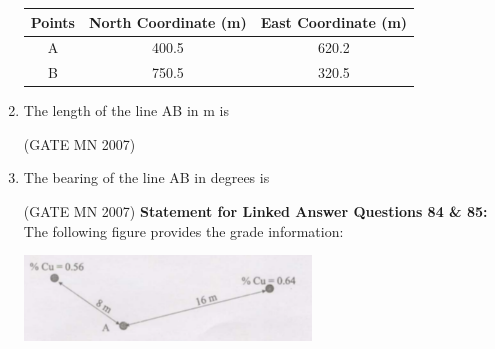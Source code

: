 \documentclass[journal]{IEEEtran}
\begin{document}
\begin{enumerate}
\begin{tabular}{|c|c|c|}
\hline
Points & North Coordinate (m) & East Coordinate (m) \\
\hline
A & 400.5 & 620.2 \\
\hline
B & 750.5 & 320.5 \\
\hline
\end{tabular}

\item The length of the line AB in m is  
\begin{enumerate}
\end{enumerate}
\hfill (GATE MN 2007)

\item The bearing of the line AB in degrees is  
\begin{enumerate}
\end{enumerate}
\hfill (GATE MN 2007)
\textbf{Statement for Linked Answer Questions 84 \& 85:} The following figure provides the grade information:

\begin{center}                                  
\includegraphics[width=0.6\textwidth]{Screenshot_2025_0812_201406.png}                 
\end{center}


\end{enumerate}
\end{document}
